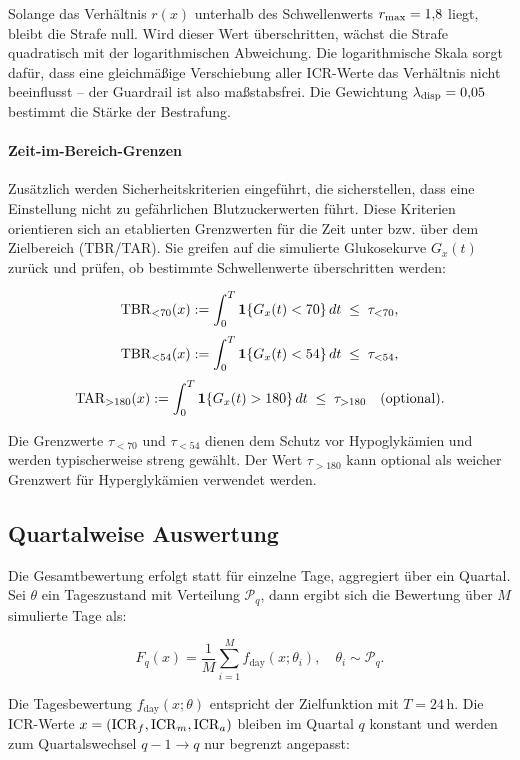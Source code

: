 \noindent Solange das Verhältnis \(r(x)\) unterhalb des Schwellenwerts \(r_{\max} = 1{,}8\) liegt, bleibt die Strafe null. Wird dieser Wert überschritten, wächst die Strafe quadratisch mit der logarithmischen Abweichung. Die logarithmische Skala sorgt dafür, dass eine gleichmäßige Verschiebung aller ICR-Werte das Verhältnis nicht beeinflusst – der Guardrail ist also maßstabsfrei. Die Gewichtung \(\lambda_{\mathrm{disp}} = 0{,}05\) bestimmt die Stärke der Bestrafung. \\

\paragraph{Zeit-im-Bereich-Grenzen}
Zusätzlich werden Sicherheitskriterien eingeführt, die sicherstellen, dass eine Einstellung nicht zu gefährlichen Blutzuckerwerten führt. Diese Kriterien orientieren sich an etablierten Grenzwerten für die Zeit unter bzw. über dem Zielbereich (TBR/TAR). Sie greifen auf die simulierte Glukosekurve \(G_x(t)\) zurück und prüfen, ob bestimmte Schwellenwerte überschritten werden:

\[
\mathrm{TBR}_{<70}(x) := \int_0^T \mathbf{1}\{G_x(t)<70\}\,dt \;\le\; \tau_{<70},
\]
\[
\mathrm{TBR}_{<54}(x) := \int_0^T \mathbf{1}\{G_x(t)<54\}\,dt \;\le\; \tau_{<54},
\]
\[
\mathrm{TAR}_{>180}(x) := \int_0^T \mathbf{1}\{G_x(t)>180\}\,dt \;\le\; \tau_{>180}\quad \text{(optional)}.
\]

\noindent Die Grenzwerte \(\tau_{<70}\) und \(\tau_{<54}\) dienen dem Schutz vor Hypoglykämien und werden typischerweise streng gewählt. Der Wert \(\tau_{>180}\) kann optional als weicher Grenzwert für Hyperglykämien verwendet werden.

\subsection{Quartalweise Auswertung}

Die Gesamtbewertung erfolgt statt für einzelne Tage, aggregiert über ein Quartal. Sei \(\theta\) ein Tageszustand mit Verteilung \(\mathcal P_q\), dann ergibt sich die Bewertung über \(M\) simulierte Tage als:

\[
F_q(x) = \frac{1}{M} \sum_{i=1}^M f_{\text{day}}(x;\theta_i), \quad \theta_i \sim \mathcal P_q.
\]

Die Tagesbewertung \(f_{\text{day}}(x;\theta)\) entspricht der Zielfunktion mit \(T=24\,\mathrm{h}\). Die ICR-Werte \(x=(\mathrm{ICR}_f,\mathrm{ICR}_m,\mathrm{ICR}_a)\) bleiben im Quartal \(q\) konstant und werden zum Quartalswechsel \(q-1\to q\) nur begrenzt angepasst:

